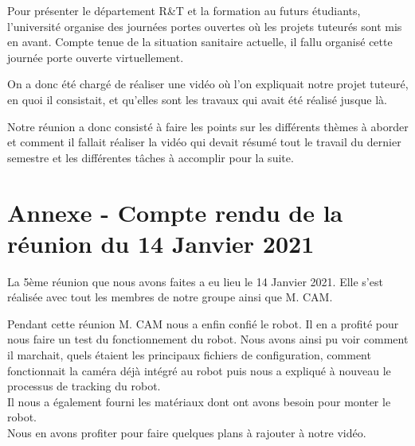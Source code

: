 \documentclass{PackagerQualityN}
\begin{document}
Pour présenter le département R\&T et la formation au futurs étudiants, l'université organise des journées portes ouvertes où les projets tuteurés sont mis en avant. Compte tenue de la situation sanitaire actuelle, il fallu organisé cette journée porte ouverte virtuellement.

On a donc été chargé de réaliser une vidéo où l'on expliquait notre projet tuteuré, en quoi il consistait, et qu'elles sont les travaux qui avait été réalisé jusque là.

Notre réunion a donc consisté à faire les points sur les différents thèmes à aborder et comment il fallait réaliser la vidéo qui devait résumé tout le travail du dernier semestre et les différentes tâches à accomplir pour la suite.


\newp
\section*{Annexe - Compte rendu de la réunion du 14 Janvier 2021}
La 5ème réunion que nous avons faites a eu lieu le 14 Janvier 2021. Elle s'est réalisée avec tout les membres de notre groupe ainsi que M. CAM.


Pendant cette réunion M. CAM nous a enfin confié le robot. Il en a profité pour nous faire un test du fonctionnement du robot. Nous avons ainsi pu voir comment il marchait, quels étaient les principaux fichiers de configuration, comment fonctionnait la caméra déjà intégré au robot puis nous a expliqué à nouveau le processus de tracking du robot.
\\

Il nous a également fourni les matériaux dont ont avons besoin pour monter le robot.
\\

Nous en avons profiter pour faire quelques plans à rajouter à notre vidéo.

\newp       %

\listoffigures

\newp



\end{document}
